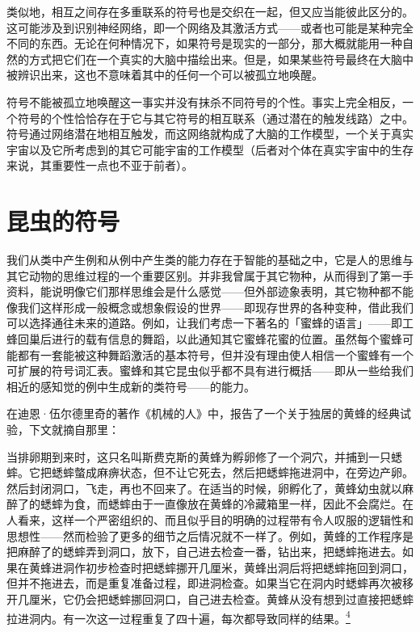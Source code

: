 \documentclass[
  12pt,
  twoside,
  openright,
  oldfontcommands,
]{memoir}
\newenvironment{fsquote}{%
  \begin{mdframed}[style=gebquote]\kaitifamily\small%
}{%
  \end{mdframed}%
}
\begin{document}
类似地，相互之间存在多重联系的符号也是交织在一起，但又应当能彼此区分的。这可能涉及到识别神经网络，即一个网络及其激活方式------或者也可能是某种完全不同的东西。无论在何种情况下，如果符号是现实的一部分，那大概就能用一种自然的方式把它们在一个真实的大脑中描绘出来。但是，如果某些符号最终在大脑中被辨识出来，这也不意味着其中的任何一个可以被孤立地唤醒。

符号不能被孤立地唤醒这一事实并没有抹杀不同符号的个性。事实上完全相反，一个符号的个性恰恰存在于它与其它符号的相互联系（通过潜在的触发线路）之中。符号通过网络潜在地相互触发，而这网络就构成了大脑的工作模型，一个关于真实宇宙以及它所考虑到的其它可能宇宙的工作模型（后者对个体在真实宇宙中的生存来说，其重要性一点也不亚于前者）。

\section{昆虫的符号}

我们从类中产生例和从例中产生类的能力存在于智能的基础之中，它是人的思维与其它动物的思维过程的一个重要区别。并非我曾属于其它物种，从而得到了第一手资料，能说明像它们那样思维会是什么感觉------但外部迹象表明，其它物种都不能像我们这样形成一般概念或想象假设的世界------即现存世界的各种变种，借此我们可以选择通往未来的道路。例如，让我们考虑一下著名的「蜜蜂的语言」------即工蜂回巢后进行的载有信息的舞蹈，以此通知其它蜜蜂花蜜的位置。虽然每个蜜蜂可能都有一套能被这种舞蹈激活的基本符号，但并没有理由使人相信一个蜜蜂有一个可扩展的符号词汇表。蜜蜂和其它昆虫似乎都不具有进行概括------即从一些给我们相近的感知觉的例中生成新的类符号------的能力。

在迪恩·伍尔德里奇的著作《机械的人》中，报告了一个关于独居的黄蜂的经典试验，下文就摘自那里：

\begin{fsquote}
当排卵期到来时，这只名叫斯费克斯的黄蜂为孵卵修了一个洞穴，并捕到一只蟋蟀。它把蟋蟀螫成麻痹状态，但不让它死去，然后把蟋蟀拖进洞中，在旁边产卵。然后封闭洞口，飞走，再也不回来了。在适当的时候，卵孵化了，黄蜂幼虫就以麻醉了的蟋蟀为食，而蟋蟀由于一直像放在黄蜂的冷藏箱里一样，因此不会腐烂。在人看来，这样一个严密组织的、而且似乎目的明确的过程带有令人叹服的逻辑性和思想性------然而检验了更多的细节之后情况就不一样了。例如，黄蜂的工作程序是把麻醉了的蟋蟀弄到洞口，放下，自己进去检查一番，钻出来，把蟋蟀拖进去。如果在黄蜂进洞作初步检查时把蟋蟀挪开几厘米，黄蜂出洞后将把蟋蟀拖回到洞口，但并不拖进去，而是重复准备过程，即进洞检查。如果当它在洞内时蟋蟀再次被移开几厘米，它仍会把蟋蟀挪回洞口，自己进去检查。黄蜂从没有想到过直接把蟋蟀拉进洞内。有一次这一过程重复了四十遍，每次都导致同样的结果。\hyperref[fn:Chapter11-4]{\textsuperscript{4}}
\end{fsquote}
\end{document}
